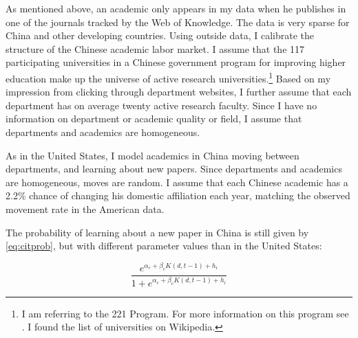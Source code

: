 As mentioned above, an academic only appears in my data when he
publishes in one of the journals tracked by the Web of Knowledge.  The
data is very sparse for China and other developing countries.  Using outside data,
I calibrate the structure of the Chinese 
academic labor market.  I assume that the 117 participating universities in
a Chinese government program for improving higher education make up the universe
of active research universities.\footnote{I am referring to the 221 Program.
    For more information on this program see \citet{lixu2004china}.  I found the 
list of universities on Wikipedia.}
   Based on my impression from clicking through 
department websites, I further assume that each department has on average
twenty active research faculty.  Since I have no information on department or academic 
quality or field, I assume that departments and academics are homogeneous.

As in the United States, I model academics in China moving between departments,
and learning about new papers.  Since departments and academics are 
homogeneous, moves are random.  I assume that each Chinese academic has a 2.2\%
chance of changing his domestic affiliation each year, matching the observed 
movement rate in the American data.

The probability of learning about a new paper in China is still given by
\eqref{eq:citprob}, but with different parameter values than in the United
States:  

\begin{equation}
    \frac{e^{\alpha_c + \beta_c K(d,t-1) + h_i}}{1 + e^{\alpha_c + \beta_c K(d,t-1) + h_i}}
    \label{eq:citprob_china}
\end{equation}

